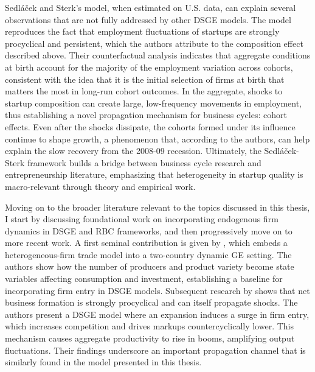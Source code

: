 \documentclass[a4paper,12pt]{article} %
\numberwithin{equation}{section} %
\numberwithin{figure}{section}
\numberwithin{table}{section}
\begin{document}
Sedláček and Sterk’s model, when estimated on U.S. data, can explain several observations that are not fully addressed by other DSGE models. 
The model reproduces the fact that employment fluctuations of startups are strongly procyclical and persistent, which the authors 
attribute to the composition effect described above. Their counterfactual analysis indicates that aggregate conditions at birth 
account for the majority of the employment variation across cohorts, consistent with the idea that it is the initial selection of 
firms at birth that matters the most in long-run cohort outcomes. In the aggregate, shocks to startup composition can create large, 
low-frequency movements in employment, thus establishing a novel propagation mechanism for business cycles: cohort effects. 
Even after the shocks dissipate, the cohorts formed under its influence continue to shape growth, a phenomenon that, according to the 
authors, can help explain the slow recovery from the 2008-09 recession. Ultimately, the Sedláček-Sterk framework builds a bridge 
between business cycle research and entrepreneurship literature, emphasizing that heterogeneity in startup quality is 
macro-relevant through theory and empirical work.

Moving on to the broader literature relevant to the topics discussed in this thesis, I start by discussing foundational work on 
incorporating endogenous firm dynamics in DSGE and RBC frameworks, and then progressively move on to more recent work. 
A first seminal contribution is given by \textcite{ghironi2007trade}, which embeds a heterogeneous-firm trade model into
a two-country dynamic GE setting. The authors show how the number of producers and product variety become state variables
affecting consumption and investment, establishing a baseline for incorporating firm entry in DSGE models. 
Subsequent research by \textcite{jaimovich2008firm} shows that net business formation is strongly procyclical 
and can itself propagate shocks. The authors present a DSGE model where an expansion induces a surge in firm entry, 
which increases competition and drives markups countercyclically lower. This mechanism causes aggregate productivity to 
rise in booms, amplifying output fluctuations. Their findings underscore an important propagation channel 
that is similarly found in the model presented in this thesis.
\end{document}

